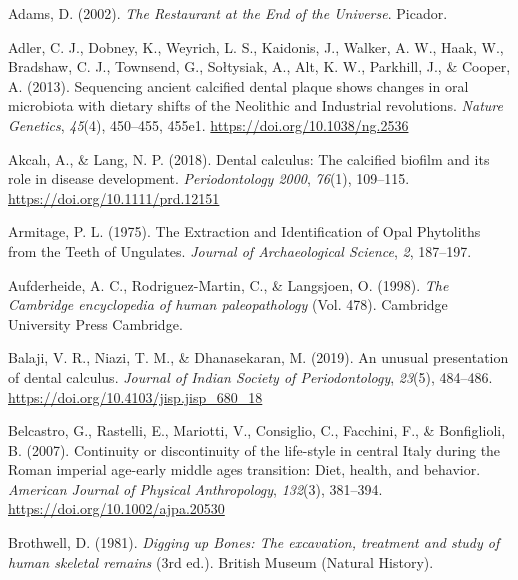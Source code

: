 \documentclass[
  letterpaper,
]{book}
\newlength{\cslhangindent}
\newlength{\cslentryspacingunit} %
\newenvironment{CSLReferences}[2] %
 {%
  \setlength{\parindent}{0pt}
  \ifodd #1
  \let\oldpar\par
  \def\par{\hangindent=\cslhangindent\oldpar}
  \fi
  \setlength{\parskip}{#2\cslentryspacingunit}
 }%
 {}
\begin{document}
\hypertarget{refs-1}{}
\begin{CSLReferences}{1}{0}
\leavevmode{}%
Adams, D. (2002). \emph{The {Restaurant} at the {End} of the
{Universe}}. {Picador}.

\leavevmode{}%
Adler, C. J., Dobney, K., Weyrich, L. S., Kaidonis, J., Walker, A. W.,
Haak, W., Bradshaw, C. J., Townsend, G., Sołtysiak, A., Alt, K. W.,
Parkhill, J., \& Cooper, A. (2013). Sequencing ancient calcified dental
plaque shows changes in oral microbiota with dietary shifts of the
{Neolithic} and {Industrial} revolutions. \emph{Nature Genetics},
\emph{45}(4), 450--455, 455e1. \url{https://doi.org/10.1038/ng.2536}

\leavevmode{}%
Akcalı, A., \& Lang, N. P. (2018). Dental calculus: The calcified
biofilm and its role in disease development. \emph{Periodontology 2000},
\emph{76}(1), 109--115. \url{https://doi.org/10.1111/prd.12151}

\leavevmode{}%
Armitage, P. L. (1975). The {Extraction} and {Identification} of {Opal
Phytoliths} from the {Teeth} of {Ungulates}. \emph{Journal of
Archaeological Science}, \emph{2}, 187--197.

\leavevmode{}%
Aufderheide, A. C., Rodriguez-Martin, C., \& Langsjoen, O. (1998).
\emph{The {Cambridge} encyclopedia of human paleopathology} (Vol. 478).
{Cambridge University Press Cambridge}.

\leavevmode{}%
Balaji, V. R., Niazi, T. M., \& Dhanasekaran, M. (2019). An unusual
presentation of dental calculus. \emph{Journal of Indian Society of
Periodontology}, \emph{23}(5), 484--486.
\url{https://doi.org/10.4103/jisp.jisp_680_18}

\leavevmode{}%
Belcastro, G., Rastelli, E., Mariotti, V., Consiglio, C., Facchini, F.,
\& Bonfiglioli, B. (2007). Continuity or discontinuity of the life-style
in central {Italy} during the {Roman} imperial age-early middle ages
transition: {Diet}, health, and behavior. \emph{American Journal of
Physical Anthropology}, \emph{132}(3), 381--394.
\url{https://doi.org/10.1002/ajpa.20530}

\leavevmode{}%
Brothwell, D. (1981). \emph{Digging up {Bones}: {The} excavation,
treatment and study of human skeletal remains} (3rd ed.). {British
Museum (Natural History)}.


\end{CSLReferences}
\end{document}
